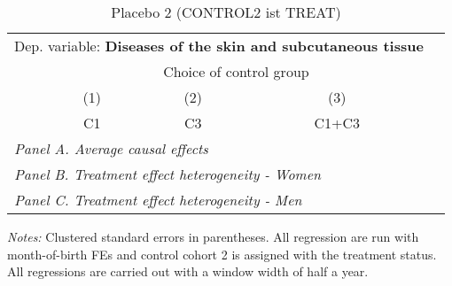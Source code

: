  \begin{table}[H] \centering \begin{threeparttable} \caption{Placebo 2 (CONTROL2 ist TREAT) } {\def\sym#1{\ifmmode^{#1}\else\(^{#1}\)\fi} \begin{tabular}{l*{4}{c}} \toprule \multicolumn{4}{l}{Dep. variable: \textbf{Diseases of the skin and subcutaneous tissue}} \\ & \multicolumn{3}{c}{Choice of control group} \\ \cmidrule(lr){2-4}
            &\multicolumn{1}{c}{(1)}&\multicolumn{1}{c}{(2)}&\multicolumn{1}{c}{(3)}\\
            &\multicolumn{1}{c}{C1}&\multicolumn{1}{c}{C3}&\multicolumn{1}{c}{C1+C3}\\
\midrule
 \multicolumn{4}{l}{\emph{Panel A. Average causal effects}} \\      \midrule\multicolumn{4}{l}{\emph{Panel B. Treatment effect heterogeneity - Women}} \\      \midrule\multicolumn{4}{l}{\emph{Panel C. Treatment effect heterogeneity - Men}} \\      
\bottomrule \end{tabular} } \begin{tablenotes} \item \scriptsize \emph{Notes:} Clustered standard errors in parentheses. All regression are run with month-of-birth FEs and control cohort 2 is assigned with the treatment status. All regressions are carried out with a window width of half a year. \end{tablenotes} \end{threeparttable} \end{table} 
